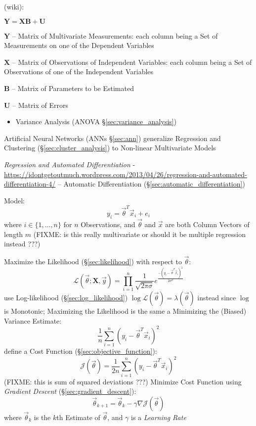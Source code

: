(wiki):

$\mathbf{Y} = \mathbf{XB} + \mathbf{U}$

$\mathbf{Y}$ -- Matrix of Multivariate Measurements: each column being a Set of
Measurements on one of the Dependent Variables

$\mathbf{X}$ -- Matrix of Observations of Independent Variables: each column
being a Set of Observations of one of the Independent Variables

$\mathbf{B}$ -- Matrix of Parameters to be Estimated

$\mathbf{U}$ -- Matrix of Errors

\begin{itemize}
  \item Variance Analysis (ANOVA \S\ref{sec:variance_analysis})
\end{itemize}

\fist Artificial Neural Networks (ANNs \S\ref{sec:ann}) generalize Regression
and Clustering (\S\ref{sec:cluster_analysis}) to Non-linear Multivariate Models

\asterism

\emph{Regression and Automated Differentiation} -
\url{https://idontgetoutmuch.wordpress.com/2013/04/26/regression-and-automated-differentiation-4/}
-- Automatic Differentiation (\S\ref{sec:automatic_differentiation})

Model:
\[
  y_i = \vec{\theta}^T \vec{x}_i + e_i
\]
where $i \in \{1, \ldots, n\}$ for $n$ Observations, and $\vec{\theta}$ and
$\vec{x}$ are both Column Vectors of length $m$ (FIXME: is this really
multivariate or should it be multiple regression instead ???)

Maximize the Likelihood (\S\ref{sec:likelihood}) with respect to $\vec{\theta}$:
\[
  \mathcal{L}(\vec{\theta}; \mathbf{X}, \vec{y}) =
    \prod_{i=1}^n \frac{1}{\sqrt{2\pi\sigma}}
      e^\frac{-(y_i - \vec{\theta}^T \vec{x}_i)^2}{2\sigma^2}
\]
use Log-likelihood (\S\ref{sec:log_likelihood}) $\log \mathcal{L}(\vec{\theta})
= \lambda(\vec{\theta})$ instead since $\log$ is Monotonic; Maximizing the
Likelihood is the same a Minimizing the (Biased) Variance Estimate:
\[
  \frac{1}{n} \sum_{i=1}^n (y_i - \vec{\theta}^T\vec{x}_i)^2
\]
define a Cost Function (\S\ref{sec:objective_function}):
\[
  \mathcal{J}(\vec{\theta}) =
    \frac{1}{2n} \sum_{i=1}^n (y_i - \vec{\theta}^T \vec{x}_i)^2
\]
(FIXME: this is sum of squared deviations ???)
Minimize Cost Function using \emph{Gradient Descent}
(\S\ref{sec:gradient_descent}):
\[
  \vec{\theta}_{k+1} = \vec{\theta}_k - \gamma \nabla \mathcal{J}(\vec{\theta})
\]
where $\vec{\theta}_k$ is the $k$th Estimate of $\vec{\theta}$, and $\gamma$ is
a \emph{Learning Rate}

